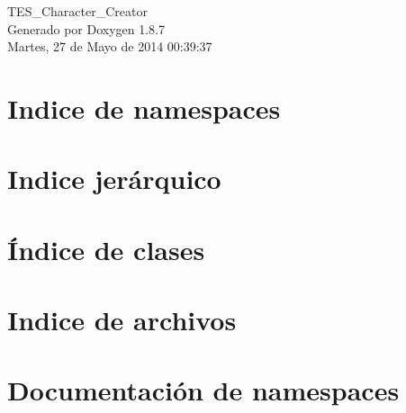 \documentclass[twoside]{book}
\newcommand{\+}{\discretionary{\mbox{\scriptsize$\hookleftarrow$}}{}{}}
\newcommand{\clearemptydoublepage}{%
  \newpage{\pagestyle{empty}\cleardoublepage}%
}
\begin{document}
\hypersetup{pageanchor=false,
             bookmarks=true,
             bookmarksnumbered=true,
             pdfencoding=unicode
            }
\begin{titlepage}
\vspace*{7cm}
\begin{center}%
{\Large T\+E\+S\+\_\+\+Character\+\_\+\+Creator }\\
\vspace*{1cm}
{\large Generado por Doxygen 1.8.7}\\
\vspace*{0.5cm}
{\small Martes, 27 de Mayo de 2014 00:39:37}\\
\end{center}
\end{titlepage}
\clearemptydoublepage
\tableofcontents
\clearemptydoublepage
{}
\hypersetup{pageanchor=true}

\chapter{Indice de namespaces}

\chapter{Indice jerárquico}

\chapter{Índice de clases}

\chapter{Indice de archivos}

\chapter{Documentación de namespaces}










\end{document}
